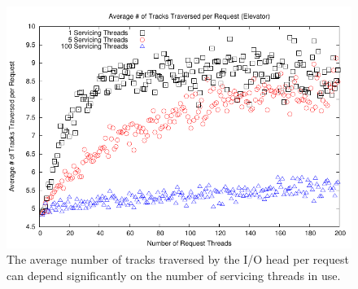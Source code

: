 \documentclass[12pt]{report}
\begin{document}
\newpage
\begin{figure}[htb!]
    \centering
    \includegraphics[scale=1]{distanceElevator.pdf}
    \caption{The average number of tracks traversed by the I/O head per request can depend
    significantly on the number of servicing threads in use.}
    \label{fig:distanceElevator}
\end{figure}
\end{document}

